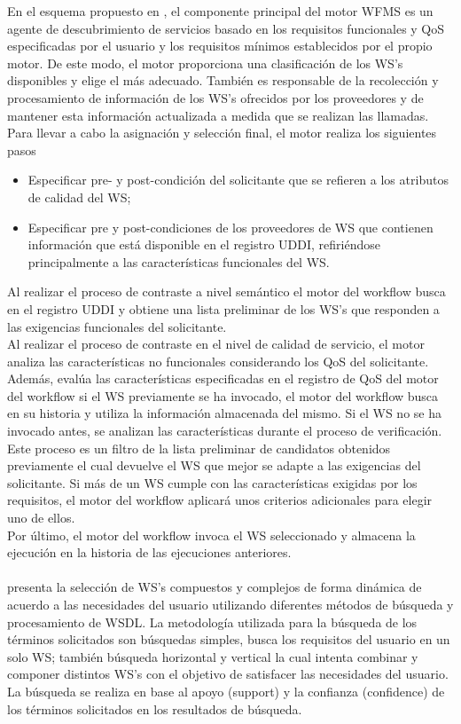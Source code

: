 En el esquema propuesto en \cite{QoS-WS-invoked}, el componente principal del motor WFMS es un agente de descubrimiento de servicios basado en los requisitos funcionales y QoS especificadas por el usuario y los requisitos mínimos establecidos por el propio motor. De este modo, el motor proporciona una clasificación de los WS's disponibles y elige el más adecuado. También es responsable de la recolección y procesamiento de información de los WS's ofrecidos por los proveedores y de mantener esta información actualizada a medida que se realizan las llamadas. Para llevar a cabo la asignación y selección final, el motor realiza los siguientes pasos\\
\begin{itemize}
	\item Especificar pre- y post-condición del solicitante que se refieren a los atributos de calidad del WS;
	\item Especificar pre y post-condiciones de los proveedores de WS  que contienen información que está disponible en el registro UDDI, refiriéndose principalmente a las características funcionales del WS.
\end{itemize}

Al realizar el proceso de contraste a nivel semántico el motor del workflow busca en el registro UDDI y obtiene una lista preliminar de los WS's que responden a las exigencias funcionales del solicitante. \\
Al realizar el proceso de contraste en el nivel de calidad de servicio, el motor analiza las características no funcionales considerando los QoS del solicitante. Además, evalúa las características especificadas en el registro de QoS del motor del workflow si el WS previamente se ha invocado, el motor del workflow busca en su historia y utiliza la información almacenada del mismo. Si el WS no se ha invocado antes, se analizan las características durante el proceso de verificación. Este proceso es un filtro de la lista preliminar de candidatos obtenidos previamente el cual devuelve el WS que mejor se adapte a las exigencias del solicitante. Si más de un WS cumple con las características exigidas por los requisitos, el motor del workflow aplicará unos criterios adicionales para elegir uno de ellos.\\
Por último, el motor del workflow invoca el WS seleccionado y almacena la ejecución en la historia de las ejecuciones anteriores.\\\\

\cite{Sumathi-Niranjan-2014} presenta la selección de WS's compuestos y complejos de forma dinámica de acuerdo a las necesidades del usuario utilizando diferentes métodos de búsqueda y procesamiento de WSDL. La metodología utilizada para la búsqueda de los términos solicitados son búsquedas simples, busca los requisitos del usuario en un solo WS;  también búsqueda horizontal y vertical la cual intenta combinar y componer distintos WS's con el objetivo de satisfacer las necesidades del usuario. La búsqueda se realiza en base al apoyo (support) y la confianza (confidence) de los términos solicitados en los resultados de búsqueda.

